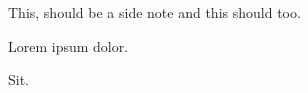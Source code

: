 \documentclass[nobib]{tufte-handout}
\begin{document}
This, should\autocite{springer} be a side note and this should too.

Lorem ipsum dolor.

Sit.

\printbibliography 
\end{document}
